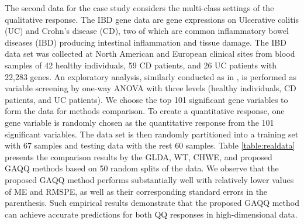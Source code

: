 \documentclass[12pt]{article}
\begin{document}
The second data for the case study considers the multi-class settings of the qualitative response.
The IBD gene data \citep{Burczynski2006Molecular} are gene expressions on Ulcerative colitis (UC) and Crohn's disease (CD), two of which are common inflammatory bowel diseases (IBD) producing intestinal inflammation and tissue damage.
The IBD data set was collected at North American and European clinical sites from blood samples of 42 healthy individuals, 59 CD patients, and 26 UC patients with 22,283 genes.
An exploratory analysis, similarly conducted as in \cite{Shao2011Sparse}, is performed as variable screening by one-way ANOVA with three levels (healthy individuals, CD patients, and UC patients).
We choose the top 101 significant gene variables to form the data for methods comparison.
To create a quantitative response, one gene variable is randomly chosen as the quantitative response from the 101 significant variables.
The data set is then randomly partitioned into a training set with 67 samples and testing data with the rest 60 samples.
Table \ref{table:realdata} presents the comparison results by the GLDA, WT, CHWE, and proposed GAQQ methods based on 50 random splits of the data.
We observe that the proposed GAQQ method performs substantially well with relatively lower values of ME and RMSPE, as well as their corresponding standard errors in the parenthesis.
Such empirical results demonstrate that the proposed GAQQ method can achieve accurate predictions for both QQ responses in high-dimensional data.
\end{document}
